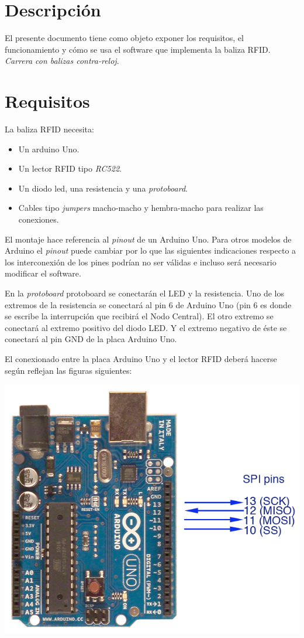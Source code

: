 \section{Descripción}
El presente documento tiene como objeto exponer los requisitos, el funcionamiento  y cómo se usa el software que implementa la baliza RFID. \textit{Carrera con balizas contra-reloj}.

\section{Requisitos}
La baliza RFID necesita:
\begin{itemize}

   \item Un arduino Uno.
   \item Un lector RFID tipo \textit{RC522}. 
   \item Un diodo led, una resistencia y una \textit{protoboard}.
   \item Cables tipo \textit{jumpers} macho-macho y hembra-macho para realizar las conexiones.

\end{itemize}

El montaje hace referencia al \textit{pinout} de un Arduino Uno. Para otros modelos de Arduino el \textit{pinout} puede cambiar por lo que las siguientes indicaciones respecto a los interconexión de los pines podrían no ser válidas e incluso será necesario modificar el software.

En la \textit{protoboard} protoboard se conectarán el LED y la resistencia.  Uno de los extremos de la resistencia se conectará al pin 6 de Arduino Uno (pin 6 es donde se escribe la interrupción que recibirá el Nodo Central).  El otro extremo se conectará al extremo positivo del diodo LED.  Y el extremo negativo de éste se conectará al pin GND de la placa Arduino Uno.

El conexionado entre la placa Arduino Uno y el lector RFID deberá hacerse según reflejan las figuras siguientes:

\includegraphics[scale=1,
         keepaspectratio]{./Figures/Arudiuno_SPI_pins.png}
         
